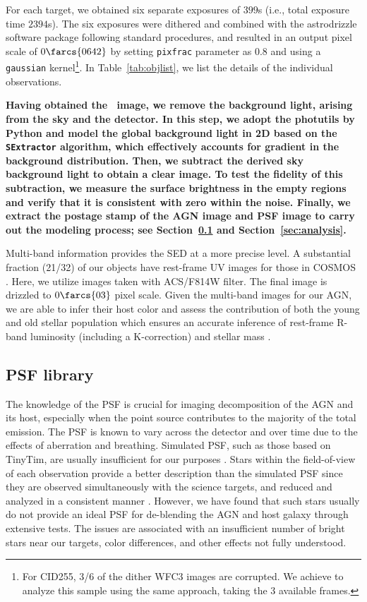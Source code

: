 \documentclass[apj]{emulateapj}
\begin{document}
For each target, we obtained six separate exposures of $399$s (i.e., total exposure time $2394$s). The six exposures were dithered and combined with the {\sc astrodrizzle} software package following standard procedures, and resulted in an output pixel scale of $0\farcs{0642}$ by setting \texttt{pixfrac} parameter as $0.8$ and using a \texttt{gaussian} kernel\footnote{\label{note1}For CID255, 3/6 of the dither WFC3 images are corrupted. We achieve to analyze this sample using the same approach, taking the 3 available frames.}. In Table~\ref{tab:objlist}, we list the details of the individual observations.

{\bf Having obtained the \hst\ image, we remove the background light, arising from the sky and the detector. In this step, we adopt the {\sc photutils} by Python and model the global background light in 2D based on the \texttt{SExtractor} algorithm, which effectively accounts for gradient in the background distribution. Then, we subtract the derived  sky background light to obtain a clear image. To test the fidelity of this subtraction, we measure the surface brightness in the empty regions and verify that it is consistent with zero within the noise. Finally, we extract the postage stamp of the AGN image and PSF image to carry out the modeling process; see Section~\ref{sec:psf_library} and Section~\ref{sec:analysis}.} 

Multi-band information provides the SED at a more precise level. A substantial fraction (21/32) of our objects have rest-frame UV images for those in COSMOS \citep{Koekemoer2007}. Here, we utilize images taken with ACS/F814W filter. The final image is drizzled to $0\farcs{03}$ pixel scale. Given the multi-band images for our AGN, we are able to infer their host color and assess the contribution of both the young and old stellar population which ensures an accurate inference of rest-frame R-band luminosity (including a K-correction) and stellar mass \citep{Gallazzi2009}. 

\subsection{PSF library}
\label{sec:psf_library}

The knowledge of the PSF is crucial for imaging decomposition of the AGN and its host, especially when the point source contributes to the majority of the total emission. The PSF is known to vary across the detector and over time due to the effects of aberration and breathing. Simulated PSF, such as those based on {\sc TinyTim}, are usually insufficient for our purposes \citep{Mechtley2012}. Stars within the field-of-view of each observation provide a better description than the simulated PSF since they are observed simultaneously with the science targets, and reduced and analyzed in a consistent manner \citet{Kim2008, Park15}. However, we have found that such stars usually do not provide an ideal PSF for de-blending the AGN and host galaxy through extensive tests. The issues are associated with an insufficient number of bright stars near our targets, color differences, and other effects not fully understood.
\end{document}
